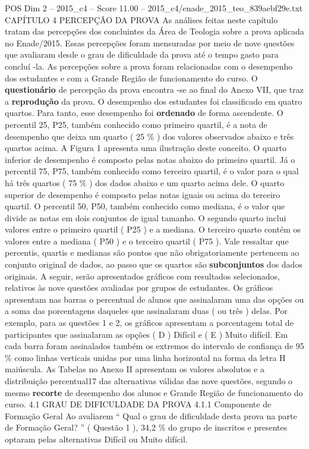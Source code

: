 \begin{textsample}{POS Dim 2 – 2015\_c4 – Score 11.00 – 2015\_c4/enade\_2015\_teo\_839aebf29e.txt}  \label{ex:f2_pos_081}
CAPÍTULO 4 PERCEPÇÃO DA PROVA As análises feitas neste capítulo tratam das percepções dos concluintes da Área de Teologia sobre a prova aplicada no Enade/2015.
Essas percepções foram mensuradas por meio de nove questões que avaliaram desde o grau de dificuldade da prova até o tempo gasto para concluí -la.
As percepções sobre a prova foram relacionadas com o desempenho dos estudantes e com a Grande Região de funcionamento do curso.
O \textbf{questionário} de percepção da prova encontra -se ao final do Anexo VII, que traz a \textbf{reprodução} da prova.
O desempenho dos estudantes foi classificado em quatro quartos.
Para tanto, esse desempenho foi \textbf{ordenado} de forma ascendente.
O percentil 25, P25, também conhecido como primeiro quartil, é a nota de desempenho que deixa um quarto ( 25 \% ) dos valores observados abaixo e três quartos acima.
A Figura 1 apresenta uma ilustração deste conceito.
O quarto inferior de desempenho é composto pelas notas abaixo do primeiro quartil.
Já o percentil 75, P75, também conhecido como terceiro quartil, é o valor para o qual há três quartos ( 75 \% ) dos dados abaixo e um quarto acima dele.
O quarto superior de desempenho é composto pelas notas iguais ou acima do terceiro quartil.
O percentil 50, P50, também conhecido como mediana, é o valor que divide as notas em dois conjuntos de igual tamanho.
O segundo quarto inclui valores entre o primeiro quartil ( P25 ) e a mediana.
O terceiro quarto contém os valores entre a mediana ( P50 ) e o terceiro quartil ( P75 ).
Vale ressaltar que percentis, quartis e medianas são pontos que não obrigatoriamente pertencem ao conjunto original de dados, ao passo que os quartos são \textbf{subconjuntos} dos dados originais.
A seguir, serão apresentados gráficos com resultados selecionados, relativos às nove questões avaliadas por grupos de estudantes.
Os gráficos apresentam nas barras o percentual de alunos que assinalaram uma das opções ou a soma das porcentagens daqueles que assinalaram duas ( ou três ) delas.
Por exemplo, para as questões 1 e 2, os gráficos apresentam a porcentagem total de participantes que assinalaram as opções ( D ) Difícil e ( E ) Muito difícil.
Em cada barra foram assinalados também os extremos do intervalo de confiança de 95 \% como linhas verticais unidas por uma linha horizontal na forma da letra H maiúscula.
As Tabelas no Anexo II apresentam os valores absolutos e a distribuição percentual17 das alternativas válidas das nove questões, segundo o mesmo \textbf{recorte} de desempenho dos alunos e Grande Região de funcionamento do curso. 4.1 GRAU DE DIFICULDADE DA PROVA 4.1.1 Componente de Formação Geral Ao avaliarem “ Qual o grau de dificuldade desta prova na parte de Formação Geral? ” ( Questão 1 ), 34,2 \% do grupo de inscritos e presentes optaram pelas alternativas Difícil ou Muito difícil.

\end{textsample}
